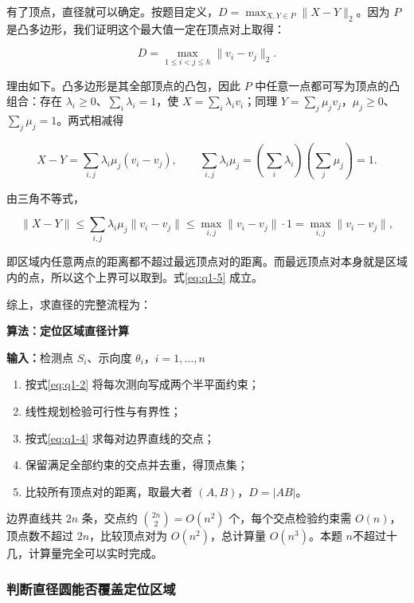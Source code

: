 有了顶点，直径就可以确定。按题目定义，$D=\max_{X,Y\in P}\|X-Y\|_2$。因为 $P$ 是凸多边形，我们证明这个最大值一定在顶点对上取得：

\begin{equation}\label{eq:q1-5}
D=\max_{1\le i<j\le h}\|v_i-v_j\|_2 .
\end{equation}

理由如下。凸多边形是其全部顶点的凸包，因此 $P$ 中任意一点都可写为顶点的凸组合：存在 $\lambda_i\ge0$、$\sum_i\lambda_i=1$，使 $X=\sum_i\lambda_iv_i$；同理 $Y=\sum_j\mu_jv_j$，$\mu_j\ge0$、$\sum_j\mu_j=1$。两式相减得

\[
X-Y=\sum_{i,j}\lambda_i\mu_j(v_i-v_j),
\qquad
\sum_{i,j}\lambda_i\mu_j=\left(\sum_i\lambda_i\right)\left(\sum_j\mu_j\right)=1 .
\]

由三角不等式，

\[
\|X-Y\|\le\sum_{i,j}\lambda_i\mu_j\|v_i-v_j\|\le\max_{i,j}\|v_i-v_j\|\cdot1=\max_{i,j}\|v_i-v_j\|,
\]

即区域内任意两点的距离都不超过最远顶点对的距离。而最远顶点对本身就是区域内的点，所以这个上界可以取到。式\eqref{eq:q1-5} 成立。

综上，求直径的完整流程为：

\par\medskip
\noindent\begin{minipage}{\linewidth}
\small
{}\label{alg:q1-diameter}
\textbf{算法\thealgorithm：定位区域直径计算}\par\smallskip
\noindent\textbf{输入：}检测点 $S_i$、示向度 $\theta_i$，$i=1,\dots,n$
\begin{enumerate}
\setlength{\itemsep}{2pt}
\setlength{\parskip}{0pt}
\item 按式\eqref{eq:q1-2} 将每次测向写成两个半平面约束；
\item 线性规划检验可行性与有界性；
\item 按式\eqref{eq:q1-4} 求每对边界直线的交点；
\item 保留满足全部约束的交点并去重，得顶点集；
\item 比较所有顶点对的距离，取最大者 $(A,B)$，$D=|AB|$。
\end{enumerate}
\end{minipage}
\par\medskip

边界直线共 $2n$ 条，交点约 $\binom{2n}{2}=O(n^2)$ 个，每个交点检验约束需 $O(n)$，顶点数不超过 $2n$，比较顶点对为 $O(n^2)$，总计算量 $O(n^3)$。本题 $n$不超过十几，计算量完全可以实时完成。

\subsubsection{判断直径圆能否覆盖定位区域}\label{sec:q1-3}

